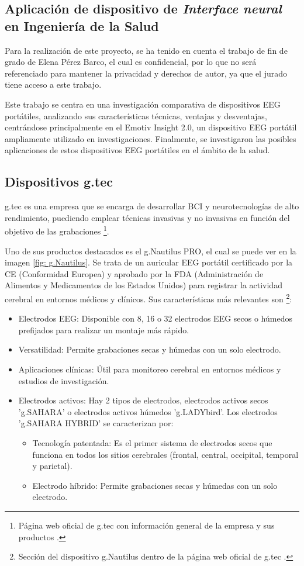 \subsection{Aplicación de dispositivo de \textit{Interface neural} en Ingeniería de la Salud}
Para la realización de este proyecto, se ha tenido en cuenta el trabajo de fin de grado de Elena Pérez Barco, el cual es confidencial, por lo que no será referenciado para mantener la privacidad y derechos de autor, ya que el jurado tiene acceso a este trabajo.

Este trabajo se centra en una investigación comparativa de dispositivos EEG portátiles, analizando sus características técnicas, ventajas y desventajas, centrándose principalmente en el Emotiv Insight 2.0, un dispositivo EEG portátil ampliamente utilizado en investigaciones. Finalmente, se investigaron las posibles aplicaciones de estos dispositivos EEG portátiles en el ámbito de la salud.


\subsection{Dispositivos g.tec}
g.tec es una empresa que se encarga de desarrollar BCI y neurotecnologías de alto rendimiento, puediendo emplear técnicas invasivas y no invasivas en función del objetivo de las grabaciones \cite{g.tec}\footnote{Página web oficial de g.tec con información general de la empresa y sus productos \cite{g.tec}.}.

Uno de sus productos destacados es el g.Nautilus PRO, el cual se puede ver en la imagen \ref{fig: g.Nautilus}. Se trata de un auricular EEG portátil certificado por la CE (Conformidad Europea) y aprobado por la FDA (Administración de Alimentos y Medicamentos de los Estados Unidos) para registrar la actividad cerebral en entornos médicos y clínicos. Sus características más relevantes son \cite{g.Nautilus}\footnote{Sección del dispositivo g.Nautilus dentro de la página web oficial de g.tec \cite{g.Nautilus}.}:
\begin{itemize}
    \item Electrodos EEG: Disponible con 8, 16 o 32 electrodos EEG secos o húmedos prefijados para realizar un montaje más rápido.
    \item Versatilidad: Permite grabaciones secas y húmedas con un solo electrodo.
    \item Aplicaciones clínicas: Útil para monitoreo cerebral en entornos médicos y estudios de investigación.
    \item Electrodos activos: Hay 2 tipos de electrodos, electrodos activos secos 'g.SAHARA' o electrodos activos húmedos 'g.LADYbird'. Los electrodos 'g.SAHARA HYBRID' se caracterizan por:
    \begin{itemize}
        \item Tecnología patentada: Es el primer sistema de electrodos secos que funciona en todos los sitios cerebrales (frontal, central, occipital, temporal y parietal).
        \item Electrodo híbrido: Permite grabaciones secas y húmedas con un solo electrodo.
    \end{itemize}
\end{itemize}


